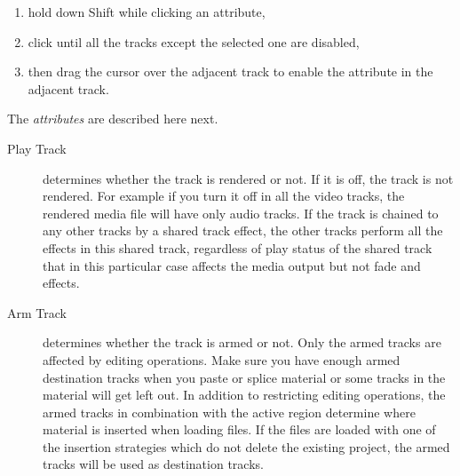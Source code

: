 \begin{enumerate}
    \item hold down Shift while clicking an attribute,
    \item click until all the tracks except the selected one are disabled,
    \item then drag the cursor over the adjacent track to enable the attribute in the adjacent track.
\end{enumerate}

The \textit{attributes} are described here next.

\begin{description}
    \item[Play Track] determines whether the track is rendered or not. If it is off, the track is not rendered.  For example if you turn it off in all the video tracks, the rendered media file will have only audio tracks.  If the track is chained to any other tracks by a shared track effect, the other tracks perform all the effects in this shared track, regardless of play status of the shared track that in this particular case affects the media output but not fade and effects.
    \item[Arm Track] determines whether the track is armed or not.  Only the armed tracks are affected by editing operations. Make sure you have enough armed destination tracks when you paste or splice material or some tracks in the material will get left out.  In addition to restricting editing operations, the armed tracks in combination with the active region determine where material is inserted when loading files.  If the files are loaded with one of the insertion strategies which do not delete the existing project, the armed  tracks will be used as destination tracks.
\end{description}

